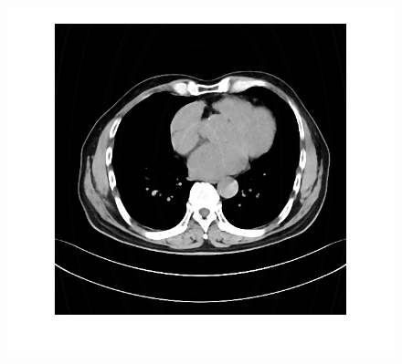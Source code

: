 \documentclass[hyperref]{ctexart}
\begin{document}
{\begin{figure}[htbp]
{				\includegraphics[scale=0.2]{333.png}
			}
			\quad
			\quad
			\subfigure[pic5.]{
}
\end{figure}}
\end{document}

